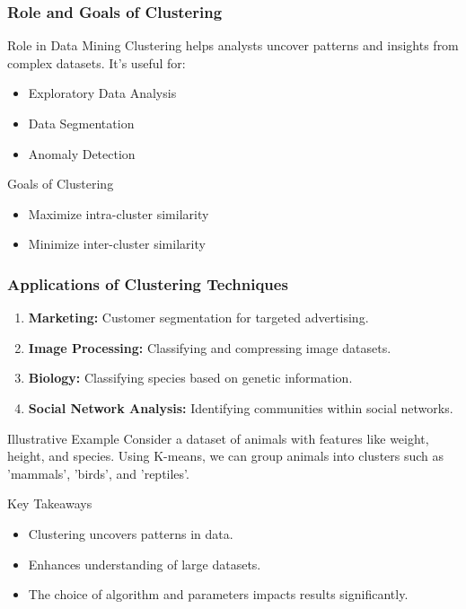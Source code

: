 \documentclass[aspectratio=169]{beamer}
\begin{document}
\begin{frame}[fragile]
    \frametitle{Role and Goals of Clustering}
    \begin{block}{Role in Data Mining}
        Clustering helps analysts uncover patterns and insights from complex datasets. It's useful for:
        \begin{itemize}
            \item Exploratory Data Analysis
            \item Data Segmentation
            \item Anomaly Detection
        \end{itemize}
    \end{block}

    \begin{block}{Goals of Clustering}
        \begin{itemize}
            \item Maximize intra-cluster similarity
            \item Minimize inter-cluster similarity
        \end{itemize}
    \end{block}
\end{frame}

\begin{frame}[fragile]
    \frametitle{Applications of Clustering Techniques}
    \begin{enumerate}
        \item \textbf{Marketing:} Customer segmentation for targeted advertising.
        \item \textbf{Image Processing:} Classifying and compressing image datasets.
        \item \textbf{Biology:} Classifying species based on genetic information.
        \item \textbf{Social Network Analysis:} Identifying communities within social networks.
    \end{enumerate}
    
    \begin{block}{Illustrative Example}
        Consider a dataset of animals with features like weight, height, and species. Using K-means, we can group animals into clusters such as 'mammals', 'birds', and 'reptiles'.
    \end{block}
    
    \begin{block}{Key Takeaways}
        \begin{itemize}
            \item Clustering uncovers patterns in data.
            \item Enhances understanding of large datasets.
            \item The choice of algorithm and parameters impacts results significantly.
        \end{itemize}
    \end{block}
\end{frame}
\end{document}
